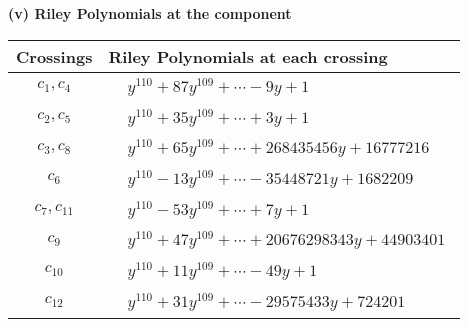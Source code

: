\documentclass[1p]{elsarticle_modified}
\theoremstyle{definition}
\begin{document}
\newpage\renewcommand{\arraystretch}{1}
\flushleft \textbf{(v) Riley Polynomials at the component}\newline \\
\begin{tabular}{m{50pt}|m{274pt}}
Crossings & \hspace{64pt}Riley Polynomials at each crossing \\
\hline $$\begin{aligned}c_{1},c_{4}\end{aligned}$$&$\begin{aligned}
&y^{110}+87 y^{109}+\cdots-9 y+1
\end{aligned}$\\
\hline $$\begin{aligned}c_{2},c_{5}\end{aligned}$$&$\begin{aligned}
&y^{110}+35 y^{109}+\cdots+3 y+1
\end{aligned}$\\
\hline $$\begin{aligned}c_{3},c_{8}\end{aligned}$$&$\begin{aligned}
&y^{110}+65 y^{109}+\cdots+268435456 y+16777216
\end{aligned}$\\
\hline $$\begin{aligned}c_{6}\end{aligned}$$&$\begin{aligned}
&y^{110}-13 y^{109}+\cdots-35448721 y+1682209
\end{aligned}$\\
\hline $$\begin{aligned}c_{7},c_{11}\end{aligned}$$&$\begin{aligned}
&y^{110}-53 y^{109}+\cdots+7 y+1
\end{aligned}$\\
\hline $$\begin{aligned}c_{9}\end{aligned}$$&$\begin{aligned}
&y^{110}+47 y^{109}+\cdots+20676298343 y+44903401
\end{aligned}$\\
\hline $$\begin{aligned}c_{10}\end{aligned}$$&$\begin{aligned}
&y^{110}+11 y^{109}+\cdots-49 y+1
\end{aligned}$\\
\hline $$\begin{aligned}c_{12}\end{aligned}$$&$\begin{aligned}
&y^{110}+31 y^{109}+\cdots-29575433 y+724201
\end{aligned}$\\
\hline
\end{tabular}\\~\\
\end{document}
